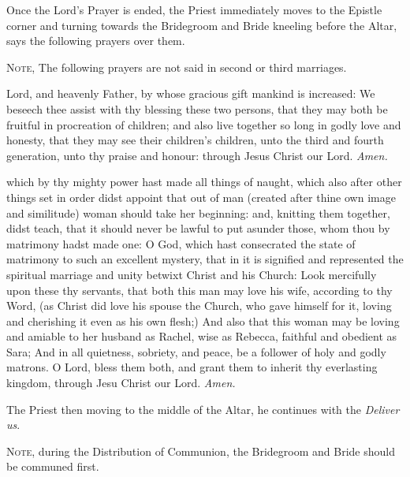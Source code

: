 \begin{rubric}
    Once the Lord's Prayer is ended, the Priest immediately moves to the Epistle corner and turning towards the Bridegroom and Bride kneeling before the Altar, says the following prayers over them.
\end{rubric}
\begin{rubric}
	\textsc{Note,} The following prayers are not said in second or third marriages.
\end{rubric}
 Lord, and heavenly Father, by whose gracious gift mankind is increased: We beseech thee assist with thy blessing these two persons, that they may both be fruitful in procreation of children; and also live together so long in godly love and honesty, that they may see their children's children, unto the third and fourth generation, unto thy praise and honour: through Jesus Christ our Lord. \textit{Amen.}\par
{} which by thy mighty power hast made all things of naught, which also after other things set in order didst appoint that out of man (created after thine own image and similitude) woman should take her beginning: and, knitting them together, didst teach, that it should never be lawful to put asunder those, whom thou by matrimony hadst made one: O God, which hast consecrated the state of matrimony to such an excellent mystery, that in it is signified and represented the spiritual marriage and unity betwixt Christ and his Church: Look mercifully upon these thy servants, that both this man may love his wife, according to thy Word, (as Christ did love his spouse the Church, who gave himself for it, loving and cherishing it even as his own flesh;) And also that this woman may be loving and amiable to her husband as Rachel, wise as Rebecca, faithful and obedient as Sara; And in all quietness, sobriety, and peace, be a follower of holy and godly matrons. O Lord, bless them both, and grant them to inherit thy everlasting kingdom, through Jesu Christ our Lord. \textit{Amen.}

\begin{rubric}
    The Priest then moving to the middle of the Altar, he continues with the \emph{Deliver us}.\par
    \textsc{Note,} during the Distribution of Communion, the Bridegroom and Bride should be communed first.
\end{rubric}


